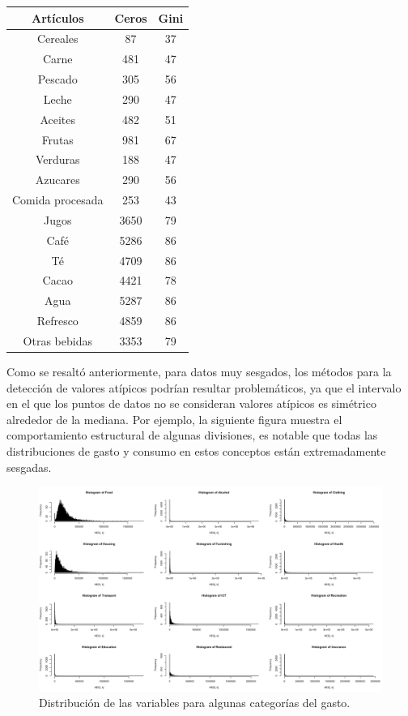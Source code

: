 \documentclass[
  10pt,
  spanish,
]{book}
\begin{document}
\begin{longtable}[]{@{}ccc@{}}
\toprule
Artículos & Ceros & Gini \\
\midrule
\endhead
Cereales & 87 & 37 \\
Carne & 481 & 47 \\
Pescado & 305 & 56 \\
Leche & 290 & 47 \\
Aceites & 482 & 51 \\
Frutas & 981 & 67 \\
Verduras & 188 & 47 \\
Azucares & 290 & 56 \\
Comida procesada & 253 & 43 \\
Jugos & 3650 & 79 \\
Café & 5286 & 86 \\
Té & 4709 & 86 \\
Cacao & 4421 & 78 \\
Agua & 5287 & 86 \\
Refresco & 4859 & 86 \\
Otras bebidas & 3353 & 79 \\
\bottomrule
\end{longtable}

Como se resaltó anteriormente, para datos muy sesgados, los métodos para la detección de valores atípicos podrían resultar problemáticos, ya que el intervalo en el que los puntos de datos no se consideran valores atípicos es simétrico alrededor de la mediana. Por ejemplo, la siguiente figura muestra el comportamiento estructural de algunas divisiones, es notable que todas las distribuciones de gasto y consumo en estos conceptos están extremadamente sesgadas.

\begin{figure}
\centering
\includegraphics{Pics/ou2.png}
\caption{Distribución de las variables para algunas categorías del gasto.}
\end{figure}
\end{document}
